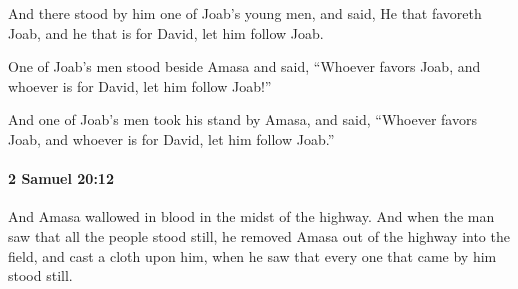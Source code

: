 			\begin{versebox}
					\item[BHS] 
					\item[ASV] And there stood by him one of Joab's young men, and said, He that favoreth Joab, and he that is for David, let him follow Joab.
					\item[NIV] One of Joab’s men stood beside Amasa and said, “Whoever favors Joab, and whoever is for David, let him follow Joab!”
					\item[NRSV] And one of Joab’s men took his stand by Amasa, and said, “Whoever favors Joab, and whoever is for David, let him follow Joab.”
			\end{versebox}

		\paragraph{2 Samuel 20:12} %
			\label{2SAMUEL-20-12}

			And Amasa wallowed in blood in the midst of the highway. And when the man saw that all the people stood still, he removed Amasa out of the highway into the field, and cast a cloth upon him, when he saw that every one that came by him stood still.

